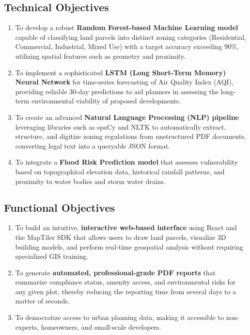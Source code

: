 \documentclass[12pt,a4paper]{report}
\begin{document}
\subsection{Technical Objectives}
\begin{enumerate}
    \item To develop a robust \textbf{Random Forest-based Machine Learning model} capable of classifying land parcels into distinct zoning categories (Residential, Commercial, Industrial, Mixed Use) with a target accuracy exceeding 90\%, utilizing spatial features such as geometry and proximity.
    \item To implement a sophisticated \textbf{LSTM (Long Short-Term Memory) Neural Network} for time-series forecasting of Air Quality Index (AQI), providing reliable 30-day predictions to aid planners in assessing the long-term environmental viability of proposed developments.
    \item To create an advanced \textbf{Natural Language Processing (NLP) pipeline} leveraging libraries such as spaCy and NLTK to automatically extract, structure, and digitize zoning regulations from unstructured PDF documents, converting legal text into a queryable JSON format.
    \item To integrate a \textbf{Flood Risk Prediction model} that assesses vulnerability based on topographical elevation data, historical rainfall patterns, and proximity to water bodies and storm water drains.
\end{enumerate}

\subsection{Functional Objectives}
\begin{enumerate}
    \item To build an intuitive, \textbf{interactive web-based interface} using React and the MapTiler SDK that allows users to draw land parcels, visualize 3D building models, and perform real-time geospatial analysis without requiring specialized GIS training.
    \item To generate \textbf{automated, professional-grade PDF reports} that summarize compliance status, amenity access, and environmental risks for any given plot, thereby reducing the reporting time from several days to a matter of seconds.
    \item To democratize access to urban planning data, making it accessible to non-experts, homeowners, and small-scale developers.
\end{enumerate}
\end{document}
